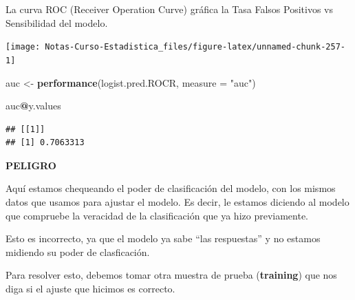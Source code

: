 \documentclass[
  12pt,
]{book}
\newenvironment{Shaded}{\begin{snugshade}}{\end{snugshade}}
\newcommand{\DataTypeTok}[1]{\textcolor[rgb]{0.13,0.29,0.53}{#1}}
\newcommand{\DecValTok}[1]{\textcolor[rgb]{0.00,0.00,0.81}{#1}}
\newcommand{\KeywordTok}[1]{\textcolor[rgb]{0.13,0.29,0.53}{\textbf{#1}}}
\newcommand{\NormalTok}[1]{#1}
\newcommand{\OperatorTok}[1]{\textcolor[rgb]{0.81,0.36,0.00}{\textbf{#1}}}
\newcommand{\StringTok}[1]{\textcolor[rgb]{0.31,0.60,0.02}{#1}}
\theoremstyle{definition}
\theoremstyle{definition}
\theoremstyle{definition}
\theoremstyle{remark}
\begin{document}
La curva ROC (Receiver Operation Curve) gráfica la Tasa Falsos Positivos vs Sensibilidad del modelo.

\begin{Shaded}
\end{Shaded}

\begin{center}\texttt{[image: Notas-Curso-Estadistica\_files/figure-latex/unnamed-chunk-257-1]} \end{center}

\begin{Shaded}
\begin{Highlighting}[]
\NormalTok{auc <-}\StringTok{ }\KeywordTok{performance}\NormalTok{(logist.pred.ROCR, }\DataTypeTok{measure =} \StringTok{"auc"}\NormalTok{)}

\NormalTok{auc}\OperatorTok{@}\NormalTok{y.values}
\end{Highlighting}
\end{Shaded}

\begin{verbatim}
## [[1]]
## [1] 0.7063313
\end{verbatim}

\textbf{PELIGRO}

Aquí estamos chequeando el poder de clasificación del modelo, con los mismos datos que usamos para ajustar el modelo. Es decir, le estamos diciendo al modelo que compruebe la veracidad de la clasificación que ya hizo previamente.

Esto es incorrecto, ya que el modelo ya sabe \enquote{las respuestas} y no estamos midiendo su poder de clasficación.

Para resolver esto, debemos tomar otra muestra de prueba (\textbf{training}) que nos diga si el ajuste que hicimos es correcto.
\end{document}
